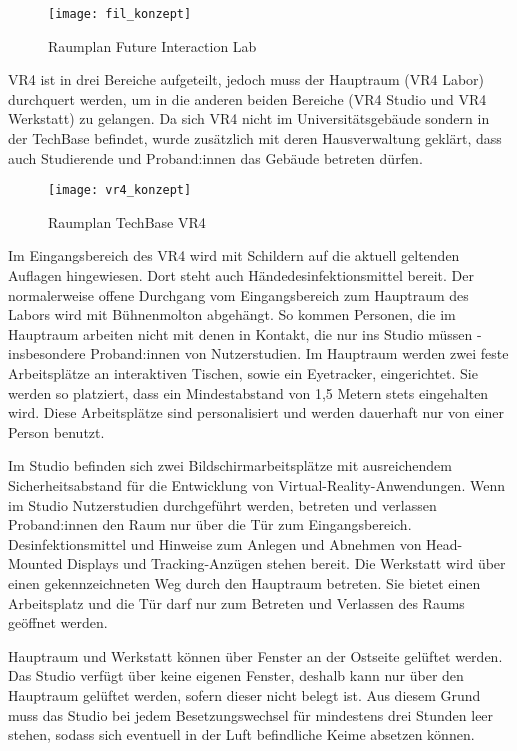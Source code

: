 \medskip
\begin{figure}[h]
    \label{fig:raumplan_fil}
    \centering
    \texttt{[image: fil\_konzept]}
    \caption{Raumplan Future Interaction Lab}
\end{figure}

\noindent
VR4 ist in drei Bereiche aufgeteilt, jedoch muss der Hauptraum (VR4 Labor) durchquert werden, um in die anderen beiden Bereiche (VR4 Studio und VR4 Werkstatt) zu gelangen. Da sich VR4 nicht im Universitätsgebäude sondern in der TechBase befindet, wurde zusätzlich mit deren Hausverwaltung geklärt, dass auch Studierende und Proband:innen das Gebäude betreten dürfen.

\medskip
\begin{figure}[h]
    \label{fig:raumplan_vr4}
    \centering
    \texttt{[image: vr4\_konzept]}
    \caption{Raumplan TechBase VR4}
\end{figure}

Im Eingangsbereich des VR4 wird mit Schildern auf die aktuell geltenden Auflagen hingewiesen.
Dort steht auch Händedesinfektionsmittel bereit.
Der normalerweise offene Durchgang vom Eingangsbereich zum Hauptraum des Labors wird mit Bühnenmolton abgehängt.
So kommen Personen, die im Hauptraum arbeiten nicht mit denen in Kontakt, die nur ins Studio müssen - insbesondere Proband:innen von Nutzerstudien.
Im Hauptraum werden zwei feste Arbeitsplätze an interaktiven Tischen, sowie ein Eyetracker, eingerichtet. Sie werden so platziert, dass ein Mindestabstand von 1,5 Metern stets eingehalten wird.
Diese Arbeitsplätze sind personalisiert und werden dauerhaft nur von einer Person benutzt.

Im Studio befinden sich zwei Bildschirmarbeitsplätze mit ausreichendem Sicherheitsabstand für die Entwicklung von Virtual-Reality-Anwendungen.
Wenn im Studio Nutzerstudien durchgeführt werden, betreten und verlassen Proband:innen den Raum nur über die Tür zum Eingangsbereich.
Desinfektionsmittel und Hinweise zum Anlegen und Abnehmen von Head-Mounted Displays und Tracking-Anzügen stehen bereit.
Die Werkstatt wird über einen gekennzeichneten Weg durch den Hauptraum betreten.
Sie bietet einen Arbeitsplatz und die Tür darf nur zum Betreten und Verlassen des Raums geöffnet werden.

Hauptraum und Werkstatt können über Fenster an der Ostseite gelüftet werden.
Das Studio verfügt über keine eigenen Fenster, deshalb kann nur über den Hauptraum gelüftet werden, sofern dieser nicht belegt ist.
Aus diesem Grund muss das Studio bei jedem Besetzungswechsel für mindestens drei Stunden leer stehen, sodass sich eventuell in der Luft befindliche Keime absetzen können.

